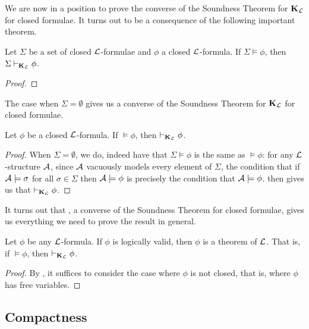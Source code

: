 We are now in a position to prove the converse of the Soundness Theorem for $\mathbf{K}_{\mathcal{L}}$ for closed formulae. It turns out to be a consequence of the following important theorem.

\begin{boxtheorem}\label{Ch2:Thm:Generalised_KLCompleteness_Closed_Formulae}
    Let $\Sigma$ be a set of closed $\mathcal{L}$-formulae and $\phi$ a closed $\mathcal{L}$-formula. If $\Sigma \models \phi$, then $\Sigma \vdash_{\mathbf{K}_{\mathcal{L}}} \phi$.
\end{boxtheorem}
\begin{proof}
    \sorry
\end{proof}

The case when $\Sigma = \emptyset$ gives us a converse of the Soundness Theorem for $\mathbf{K}_{\mathcal{L}}$ for closed formulae.

\begin{boxcorollary}\label{Ch2:Cor:KLCompleteness_Closed_Formulae}
    Let $\phi$ be a closed $\mathcal{L}$-formula. If $\models \phi$, then $\vdash_{\mathbf{K}_{\mathcal{L}}} \phi$.
\end{boxcorollary}
\begin{proof}
    When $\Sigma = \emptyset$, we do, indeed have that $\Sigma \models \phi$ is the same as $\models \phi$: for any $\mathcal{L}$-structure $\mathcal{A}$, since $\mathcal{A}$ vacuously models every element of $\Sigma$, the condition that if $\mathcal{A} \models \sigma$ for all $\sigma \in \Sigma$ then $\mathcal{A} \models \phi$ is precisely the condition that $\mathcal{A} \models \phi$.  then gives us that $\vdash_{\mathbf{K}_{\mathcal{L}}} \phi$.
\end{proof}

It turns out that , a converse of the Soundness Theorem for closed formulae, gives us everything we need to prove the result in general.

\begin{boxtheorem}\label{Ch2:Thm:Godel_Completeness}
    Let $\phi$ be any $\mathcal{L}$-formula. If $\phi$ is logically valid, then $\phi$ is a theorem of $\mathcal{L}$. That is, if $\models \phi$, then $\vdash_{\mathbf{K}_{\mathcal{L}}} \phi$.
\end{boxtheorem}
\begin{proof}
    By , it suffices to consider the case where $\phi$ is not closed, that is, where $\phi$ has free variables.
    \sorry
\end{proof}

\subsection{Compactness}
